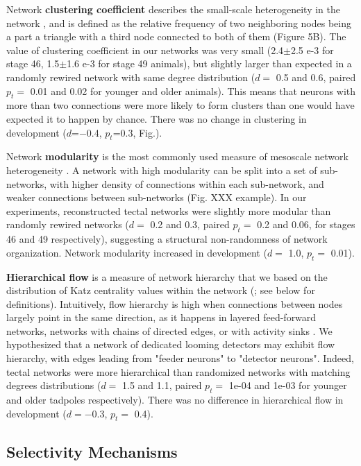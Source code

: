 \documentclass{article}
\begin{document}
Network \textbf{clustering coefficient} describes the small-scale heterogeneity in the network \citep{fagiolo2007}, and is defined as the relative frequency of two neighboring nodes being a part a triangle with a third node connected to both of them (Figure 5B). The value of clustering coefficient in our networks was very small (2.4$\pm$2.5 e-3 for stage 46, 1.5$\pm$1.6 e-3 for stage 49 animals), but slightly larger than expected in a randomly rewired network with same degree distribution ($d=$ 0.5 and 0.6, paired $p_t=$ 0.01 and 0.02 for younger and older animals). This means that neurons with more than two connections were more likely to form clusters than one would have expected it to happen by chance. There was no change in clustering in development ($d$=$-$0.4, $p_t$=0.3, Fig.).

Network \textbf{modularity} is the most commonly used measure of mesoscale network heterogeneity \citep{leicht2008community,newman2006modularity}. A network with high modularity can be split into a set of sub-networks, with higher density of connections within each sub-network, and weaker connections between sub-networks (Fig. XXX example). In our experiments, reconstructed tectal networks were slightly more modular than randomly rewired networks ($d=$ 0.2 and 0.3, paired $p_t=$ 0.2 and 0.06, for stages 46 and 49 respectively), suggesting a structural non-randomness of network organization. Network modularity increased in development ($d=$ 1.0, $p_t =$ 0.01).

\textbf{Hierarchical flow} is a measure of network hierarchy \citep{mones2012hierarchy} that we based on the distribution of Katz centrality values within the network (\citealt{katz1953original,fletcher2018katz}; see below for definitions). Intuitively, flow hierarchy is high when connections between nodes largely point in the same direction, as it happens in layered feed-forward networks, networks with chains of directed edges, or with activity sinks \citep{czegel2015hierarchy}. We hypothesized that a network of dedicated looming detectors may exhibit flow hierarchy, with edges leading from "feeder neurons" to "detector neurons". Indeed, tectal networks were more hierarchical than randomized networks with matching degrees distributions ($d=$ 1.5 and 1.1, paired $p_t=$ 1e-04 and 1e-03 for younger and older tadpoles respectively). There was no difference in hierarchical flow in development ($d=-$0.3, $p_t=$ 0.4).

\subsection*{Selectivity Mechanisms}
\end{document}
